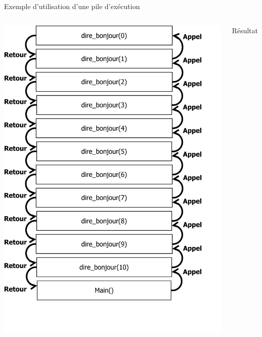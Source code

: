 \begin{frame}{Exemple d'utilisation d'une pile d'exécution}
\begin{columns}
\includegraphics[height=\textheight]{../illustration/PileAppel.pdf}
\begin{exampleblock}{Résultat}
\tiny{}
\end{exampleblock}
\end{columns}
\end{frame}





